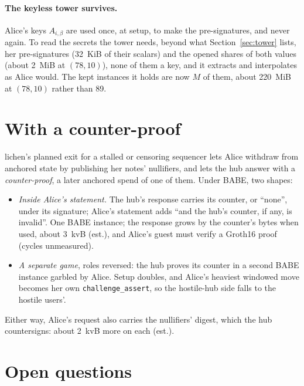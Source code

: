\documentclass[11pt]{article}
\newcommand{\tx}[1]{\texttt{#1}}
\begin{document}
\paragraph{The keyless tower survives.} Alice's keys $A_{i,\beta}$ are
used once, at setup, to make the pre-signatures, and never again. To
read the secrets the tower needs, beyond what Section~\ref{sec:tower}
lists, her pre-signatures (32~KiB of their scalars) and the opened
shares of both values (about 2~MiB at $(78, 10)$), none of them a key,
and it extracts and interpolates as Alice would. The kept instances it
holds are now $M$ of them, about 220~MiB at $(78, 10)$ rather than 89.

\section{With a counter-proof}
\label{sec:counter}

lichen's planned exit for a stalled or censoring sequencer lets Alice
withdraw from anchored state by publishing her notes' nullifiers, and
lets the hub answer with a \emph{counter-proof}, a later anchored spend
of one of them. Under BABE, two shapes:
\begin{itemize}[leftmargin=1.5em]
\item \emph{Inside Alice's statement.} The hub's response carries its
  counter, or ``none'', under its signature; Alice's statement adds
  ``and the hub's counter, if any, is invalid''. One BABE instance; the
  response grows by the counter's bytes when used, about 3~kvB (est.),
  and Alice's guest must verify a Groth16 proof (cycles unmeasured).
\item \emph{A separate game}, roles reversed: the hub proves its counter
  in a second BABE instance garbled by Alice. Setup doubles, and Alice's
  heaviest windowed move becomes her own \tx{challenge\_assert}, so the
  hostile-hub side falls to the hostile users'.
\end{itemize}
Either way, Alice's request also carries the nullifiers' digest, which
the hub countersigns: about 2~kvB more on each (est.).

\section{Open questions}
\label{sec:open}
\end{document}
